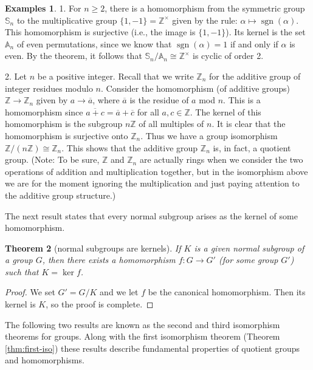 \documentclass[11pt]{article}
\newtheorem{thm}{Theorem}[section]
\theoremstyle{definition}
\newtheorem{examples}[thm]{Examples}
\newcommand{\Z}{\mathbb{Z}} %
\newcommand{\sgn}{\operatorname{sgn}}
\newcommand{\Sym}{\mathbb{S}}
\newcommand{\Alt}{\mathbb{A}}
\begin{document}
\begin{examples}\label{examples:iso-1}
1. For $n \ge 2$, there is a homomorphism from the symmetric group
$\Sym_n$ to the multiplicative group $\{1,-1\} = \Z^\times$ given by
the rule: $\alpha \mapsto \sgn(\alpha)$. This homomorphism is
surjective (i.e., the image is $\{1,-1\}$). Its kernel is the set
$\Alt_n$ of even permutations, since we know that $\sgn(\alpha) = 1$
if and only if $\alpha$ is even. By the theorem, it follows that
$\Sym_n/\Alt_n \cong \Z^\times$ is cyclic of order 2. 

2. Let $n$ be a positive integer. Recall that we write $\Z_n$ for the
additive group of integer residues modulo $n$. Consider the
homomorphism (of additive groups) $\Z \to \Z_n$ given by $a \to
\overline{a}$, where $\overline{a}$ is the residue of $a$ mod
$n$. This is a homomorphism since $\overline{a+c} = \overline{a} +
\overline{c}$ for all $a,c \in \Z$. The kernel of this homomorphism is
the subgroup $n\Z$ of all multiples of $n$.  It is clear that the
homomorphism is surjective onto $\Z_n$. Thus we have a group
isomorphism $\Z/(n\Z) \cong \Z_n$. This shows that the additive group
$\Z_n$ is, in fact, a quotient group. (Note: To be sure, $\Z$ and
$\Z_n$ are actually rings when we consider the two operations of
addition and multiplication together, but in the isomorphism above we
are for the moment ignoring the multiplication and just paying
attention to the additive group structure.)
\end{examples}



The next result states that every normal subgroup arises as the kernel
of some homomorphism.


\begin{thm}[normal subgroups are kernels] \label{thm:NAK} 
If $K$ is a given normal subgroup of a group $G$, then there exists a
homomorphism $f: G \to G'$ (for some group $G'$) such that $K= \ker
f$.
\end{thm}

\begin{proof}
We set $G' = G/K$ and we let $f$ be the canonical homomorphism. Then
its kernel is $K$, so the proof is complete. 
\end{proof}

The following two results are known as the second and third
isomorphism theorems for groups. Along with the first isomorphism
theorem (Theorem \ref{thm:first-iso}) these results describe 
fundamental properties of quotient groups and homomorphisms.
\end{document}
